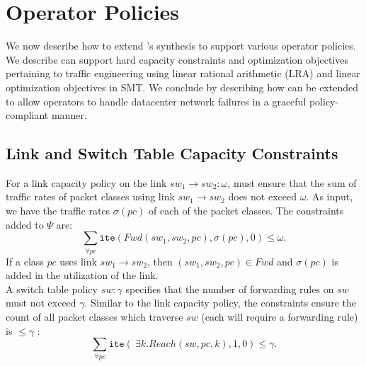 \section{Operator Policies}
\label{sec:optimization}

We now describe how to extend \Name's synthesis to support various
operator policies.  We describe \Name can support
hard capacity constraints and
optimization objectives pertaining to traffic engineering using
 linear rational arithmetic (LRA) and linear
optimization objectives in SMT. We conclude by describing how \Name can be
extended to allow operators to handle datacenter network failures in a
graceful policy-compliant manner.

\subsection{Link and Switch Table Capacity Constraints} \label{sec:linkcap}
For a link capacity policy on the link $sw_1 \rightarrow sw_2: \omega$, 
\name must ensure that the sum of traffic rates of packet
classes using link $sw_1 \rightarrow sw_2$
does not exceed $\omega$. 
As input, we have the traffic rates $\sigma(pc)$ of
each of the packet classes. The constraints added to $\Psi$ are:
\begin{equation}
 \sum_{\forall pc} \texttt{ite}(Fwd(sw_1,sw_2, pc), \sigma(pc), 0) \leq \omega .
\end{equation}
If a class $pc$ uses link $sw_1 \rightarrow sw_2$, then $(sw_1,sw_2, pc) \in Fwd$
and $\sigma(pc)$ is added in the utilization of the link. \\
\noindent A switch table policy $sw : \gamma$ specifies that the number of forwarding 
rules on $sw$ must not exceed $\gamma$. Similar to the link capacity policy,
the constraints ensure the count of all packet classes which traverse $sw$ (each 
will require a forwarding rule) is $\leq \gamma$ :
\begin{equation}
\sum_{\forall pc} \texttt{ite}(~\exists k. Reach(sw,pc,k), 1, 0)  \leq \gamma.
\end{equation}





